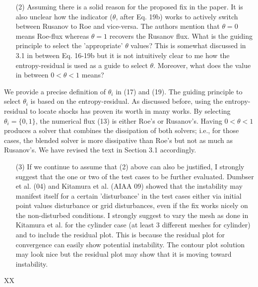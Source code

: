 \documentclass[english,11pt]{article}
\begin{document}
\bigskip
{\color{red}
  \begin{itemize}
  \item[(2)]
    Assuming there is a solid reason for the proposed fix in the paper. It is also unclear how the indicator
    ($\theta$, after Eq. 19b) works to actively switch between Rusanov to Roe and vice-versa. The authors
    mention that $\theta=0$ means Roe-flux whereas $\theta=1$ recovers the Rusanov flux. What is the guiding
    principle to select the 'appropriate' $\theta$ values? This is somewhat discussed in 3.1 in between Eq. 
    16-19b but it is not intuitively clear to me how the entropy-residual is used as a guide to select $\theta$.
    Moreover, what does the value in between $0<\theta<1$ means?
  \end{itemize}
}
\noindent
We provide a precise definition of $\theta_i$ in (17) and (19). The guiding principle to select $\theta_i$
is based on the entropy-residual. As discussed before, using the entropy-residual to locate shocks has proven
its worth in many works. 
By selecting $\theta_i=\{0,1\}$, the numerical flux (13) is either Roe's or Rusanov's.
Having $0<\theta<1$ produces a solver that combines the dissipation of both solvers; i.e.,
for those cases, the blended solver is more dissipative than Roe's but not as much as Rusanov's. 
We have revised the text in Section 3.1 accordingly. 

\bigskip
{\color{red}
  \begin{itemize}
  \item[(3)]
    If we continue to assume that (2) above can also be justified, I strongly suggest that the one or two of
    the test cases to be further evaluated. Dumbser et al. (04) and Kitamura et al. (AIAA 09) showed that the
    instability may manifest itself for a certain 'disturbance' in the test cases either via initial point values
    disturbance or grid disturbances, even if the fix works nicely on the non-disturbed conditions. I strongly
    suggest to vary the mesh as done in Kitamura et al. for the cylinder case (at least 3 different meshes for
    cylinder) and to include the residual plot. This is because the residual plot for convergence can easily show
    potential instability. The contour plot solution may look nice but the residual plot may show that it is
    moving toward instability.
  \end{itemize}
}
\noindent
XX
\end{document}
